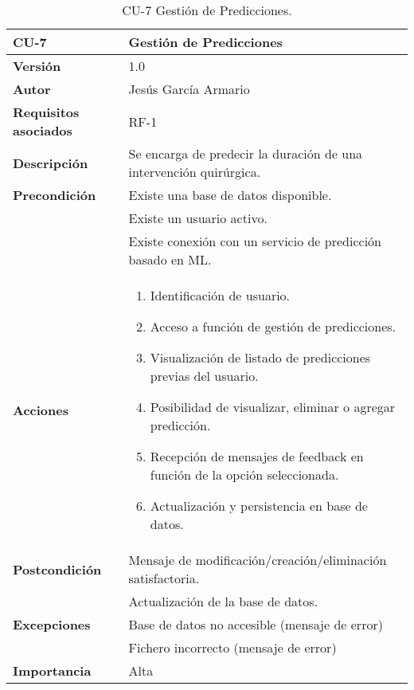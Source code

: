 \begin{table}[p]
	\centering
	\begin{tabularx}{\linewidth}{ p{} p{} }
		\toprule
		\textbf{CU-7}    & \textbf{Gestión de Predicciones}\\
		\toprule
		\textbf{Versión}              & 1.0    \\
		\textbf{Autor}                & Jesús García Armario \\
		\textbf{Requisitos asociados} & RF-1 \\
		\textbf{Descripción}          & Se encarga de predecir la duración de una intervención quirúrgica. \\
		\textbf{Precondición}         & Existe una base de datos disponible. \\
  & Existe un usuario activo.\\
  & Existe conexión con un servicio de predicción basado en ML.\\
		\textbf{Acciones}             &
		\begin{enumerate}
			\def\labelenumi{\arabic{enumi}.}
			\tightlist
			\item Identificación de usuario.
   \item Acceso a función de gestión de predicciones.
   \item Visualización de listado de predicciones previas del usuario.
   \item Posibilidad de visualizar, eliminar o agregar predicción.
   \item Recepción de mensajes de feedback en función de la opción seleccionada.
   \item Actualización y persistencia en base de datos.
\end{enumerate}\\
		\textbf{Postcondición}        &  Mensaje de modificación/creación/eliminación satisfactoria. \\
  & Actualización de la base de datos.\\
		\textbf{Excepciones}          & Base de datos no accesible (mensaje de error)\\
  & Fichero incorrecto (mensaje de error)\\
		\textbf{Importancia}          & Alta \\
		\bottomrule
	\end{tabularx}
	\caption{CU-7 Gestión de Predicciones.}
 \end{table}

